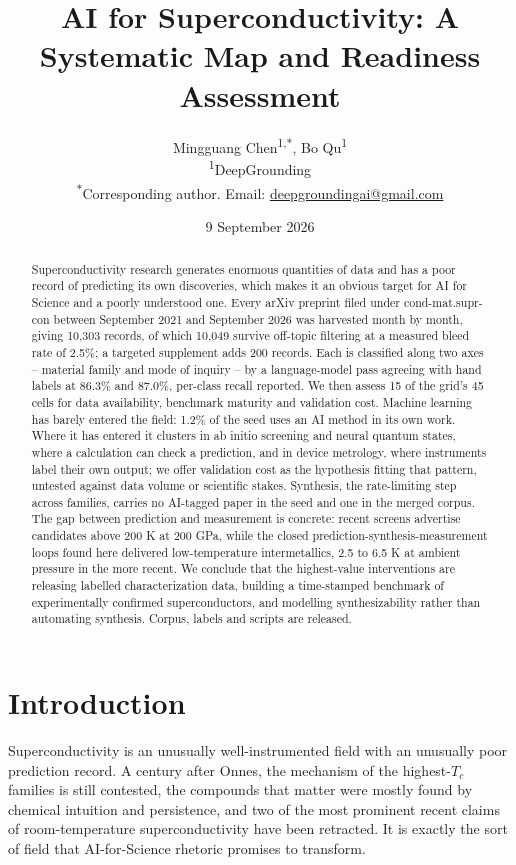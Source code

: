 \documentclass[
  11pt,
]{article}
\title{AI for Superconductivity: A Systematic Map and Readiness
Assessment}
\author{Mingguang Chen\textsuperscript{1,$*$}, Bo Qu\textsuperscript{1}\\[6pt]
{\small \textsuperscript{1}DeepGrounding}\\[2pt]
{\small \textsuperscript{$*$}Corresponding author. Email: \href{mailto:deepgroundingai@gmail.com}{deepgroundingai@gmail.com}}}
\date{9 September 2026}
\begin{document}
\maketitle
\begin{abstract}
Superconductivity research generates enormous quantities of data and has
a poor record of predicting its own discoveries, which makes it an
obvious target for AI for Science and a poorly understood one. Every
arXiv preprint filed under cond-mat.supr-con between September 2021 and
September 2026 was harvested month by month, giving 10,303 records, of
which 10,049 survive off-topic filtering at a measured bleed rate of
2.5\%; a targeted supplement adds 200 records. Each is classified along
two axes -- material family and mode of inquiry -- by a language-model
pass agreeing with hand labels at 86.3\% and 87.0\%, per-class recall
reported. We then assess 15 of the grid's 45 cells for data
availability, benchmark maturity and validation cost. Machine learning
has barely entered the field: 1.2\% of the seed uses an AI method in its
own work. Where it has entered it clusters in ab initio screening and
neural quantum states, where a calculation can check a prediction, and
in device metrology, where instruments label their own output; we offer
validation cost as the hypothesis fitting that pattern, untested against
data volume or scientific stakes. Synthesis, the rate-limiting step
across families, carries no AI-tagged paper in the seed and one in the
merged corpus. The gap between prediction and measurement is concrete:
recent screens advertise candidates above 200 K at 200 GPa, while the
closed prediction-synthesis-measurement loops found here delivered
low-temperature intermetallics, 2.5 to 6.5 K at ambient pressure in the
more recent. We conclude that the highest-value interventions are
releasing labelled characterization data, building a time-stamped
benchmark of experimentally confirmed superconductors, and modelling
synthesizability rather than automating synthesis. Corpus, labels and
scripts are released.
\end{abstract}

\section{Introduction}\label{introduction}

Superconductivity is an unusually well-instrumented field with an
unusually poor prediction record. A century after Onnes, the mechanism
of the highest-\(T_c\) families is still contested, the compounds that
matter were mostly found by chemical intuition and persistence, and two
of the most prominent recent claims of room-temperature
superconductivity have been retracted. It is exactly the sort of field
that AI-for-Science rhetoric promises to transform.
\end{document}
